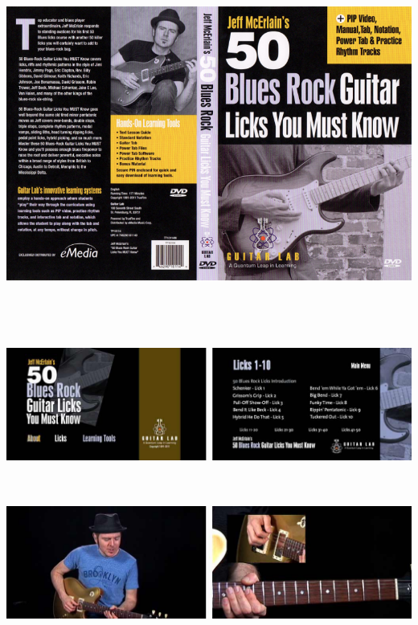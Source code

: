 \documentclass[a4paper]{book}
\begin{document}
\begin{center}
\includegraphics[width=17cm,height=11.488cm]{lebluessupportsmethodes-img79.jpg}
\end{center}


\begin{center}
\includegraphics[width=17cm,height=4.715cm]{lebluessupportsmethodes-img80.jpg}
\end{center}








\begin{center}
\includegraphics[width=17cm,height=4.715cm]{lebluessupportsmethodes-img81.jpg}
\end{center}
\end{document}
